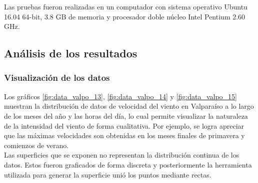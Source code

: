 Las pruebas fueron realizadas en un computador con sistema operativo Ubuntu 16.04 64-bit, 3.8 GB de memoria y procesador doble núcleo Intel Pentium 2.60 GHz. 

\subsection{Análisis de los resultados}
\subsubsection{Visualización de los datos}
Los gráficos \ref{fig:data_valpo_13}, \ref{fig:data_valpo_14} y \ref{fig:data_valpo_15} muestran la distribución de datos de velocidad del viento en Valparaíso a lo largo de los meses del año y las horas del día, lo cual permite visualizar la naturaleza de la intensidad del viento de forma cualitativa.
Por ejemplo, se logra apreciar que las máximas velocidades son obtenidas en los meses finales de primavera y comienzos de verano.\\
Las superficies que se exponen no representan la distribución continua de los datos. Estos fueron graficados de forma discreta y posteriormente la herramienta utilizada para generar la superficie unió los puntos mediante rectas.\\
